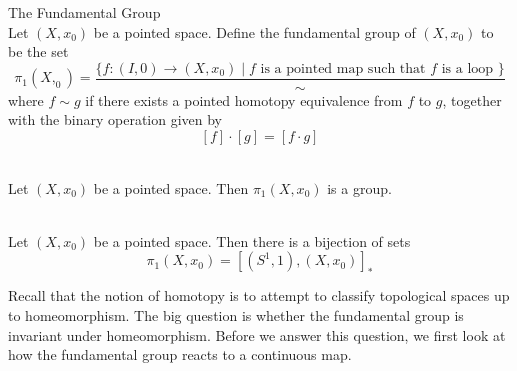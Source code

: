 \documentclass[a4paper]{article}
\begin{document}
\begin{defn}{The Fundamental Group}{}\\
Let $(X,x_0)$ be a pointed space. Define the fundamental group of $(X,x_0)$ to be the set $$\pi_1(X,_0)=\frac{\{f:(I,0)\to(X,x_0)\;|\;f\text{ is a pointed map such that }f\text{ is a loop }\}}{\sim}$$ where $f\sim g$ if there exists a pointed homotopy equivalence from $f$ to $g$, together with the binary operation given by $$[f]\cdot[g]=[f\cdot g]$$
\end{defn}

\begin{lmm}{}{}\\
Let $(X,x_0)$ be a pointed space. Then $\pi_1(X,x_0)$ is a group. 
\end{lmm}

\begin{lmm}{}{}\\
Let $(X,x_0)$ be a pointed space. Then there is a bijection of sets $$\pi_1(X,x_0)=[(S^1,1),(X,x_0)]_\ast$$
\end{lmm}

Recall that the notion of homotopy is to attempt to classify topological spaces up to homeomorphism. The big question is whether the fundamental group is invariant under homeomorphism. Before we answer this question, we first look at how the fundamental group reacts to a continuous map. 
\end{document}
